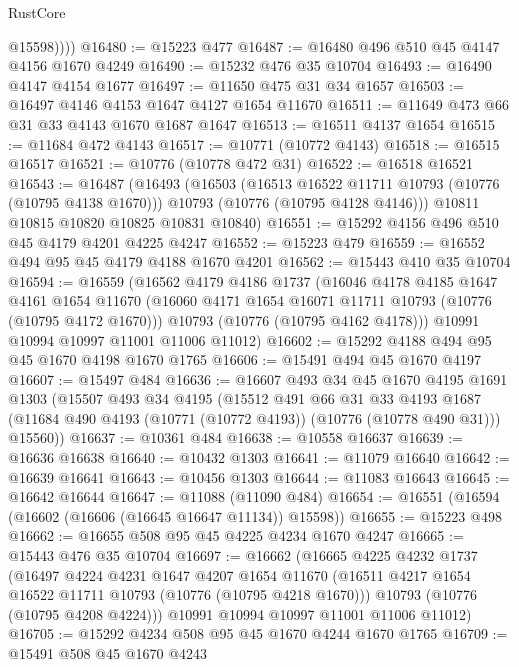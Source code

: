 \begin{lexlean}{RustCore}
\begin{coremodule}
            @15598))))
@16480 := @15223 @477
@16487 := @16480 @496 @510 @45 @4147 @4156 @1670 @4249
@16490 := @15232 @476 @35 @10704
@16493 := @16490 @4147 @4154 @1677
@16497 := @11650 @475 @31 @34 @1657
@16503 := @16497 @4146 @4153 @1647 @4127 @1654 @11670
@16511 := @11649 @473 @66 @31 @33 @4143 @1670 @1687 @1647
@16513 := @16511 @4137 @1654
@16515 := @11684 @472 @4143
@16517 := @10771 (@10772 @4143)
@16518 := @16515 @16517
@16521 := @10776 (@10778 @472 @31)
@16522 := @16518 @16521
@16543 := @16487
    (@16493
      (@16503
        (@16513 @16522 @11711 @10793 (@10776 (@10795 @4138 @1670)))
        @10793
        (@10776 (@10795 @4128 @4146)))
      @10811
      @10815
      @10820
      @10825
      @10831
      @10840)
@16551 := @15292 @4156 @496 @510 @45 @4179 @4201 @4225 @4247
@16552 := @15223 @479
@16559 := @16552 @494 @95 @45 @4179 @4188 @1670 @4201
@16562 := @15443 @410 @35 @10704
@16594 := @16559
    (@16562
      @4179
      @4186
      @1737
      (@16046
        @4178
        @4185
        @1647
        @4161
        @1654
        @11670
        (@16060 @4171 @1654 @16071 @11711 @10793 (@10776 (@10795 @4172 @1670)))
        @10793
        (@10776 (@10795 @4162 @4178)))
      @10991
      @10994
      @10997
      @11001
      @11006
      @11012)
@16602 := @15292 @4188 @494 @95 @45 @1670 @4198 @1670 @1765
@16606 := @15491 @494 @45 @1670 @4197
@16607 := @15497 @484
@16636 := @16607
    @493
    @34
    @45
    @1670
    @4195
    @1691
    @1303
    (@15507
      @493
      @34
      @4195
      (@15512
        @491
        @66
        @31
        @33
        @4193
        @1687
        (@11684 @490 @4193 (@10771 (@10772 @4193)) (@10776 (@10778 @490 @31)))
        @15560))
@16637 := @10361 @484
@16638 := @10558 @16637
@16639 := @16636 @16638
@16640 := @10432 @1303
@16641 := @11079 @16640
@16642 := @16639 @16641
@16643 := @10456 @1303
@16644 := @11083 @16643
@16645 := @16642 @16644
@16647 := @11088 (@11090 @484)
@16654 := @16551 (@16594 (@16602 (@16606 (@16645 @16647 @11134)) @15598))
@16655 := @15223 @498
@16662 := @16655 @508 @95 @45 @4225 @4234 @1670 @4247
@16665 := @15443 @476 @35 @10704
@16697 := @16662
    (@16665
      @4225
      @4232
      @1737
      (@16497
        @4224
        @4231
        @1647
        @4207
        @1654
        @11670
        (@16511 @4217 @1654 @16522 @11711 @10793 (@10776 (@10795 @4218 @1670)))
        @10793
        (@10776 (@10795 @4208 @4224)))
      @10991
      @10994
      @10997
      @11001
      @11006
      @11012)
@16705 := @15292 @4234 @508 @95 @45 @1670 @4244 @1670 @1765
@16709 := @15491 @508 @45 @1670 @4243

\end{coremodule}
\end{lexlean}
